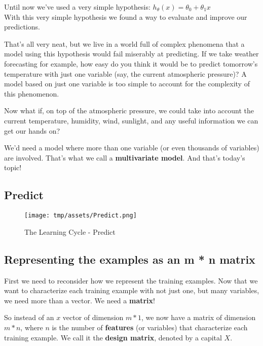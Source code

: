 \documentclass[]{article}
\begin{document}
Until now we've used a very simple hypothesis:
\(h_{\theta}(x) = \theta_0 + \theta_1 x\)\\
With this very simple hypothesis we found a way to evaluate and improve
our predictions.

That's all very neat, but we live in a world full of complex phenomena
that a model using this hypothesis would fail miserably at predicting.
If we take weather forecasting for example, how easy do you think it
would be to predict tomorrow's temperature with just one variable (say,
the current atmospheric pressure)? A model based on just one variable is
too simple to account for the complexity of this phenomenon.

Now what if, on top of the atmospheric pressure, we could take into
account the current temperature, humidity, wind, sunlight, and any
useful information we can get our hands on?

We'd need a model where more than one variable (or even thousands of
variables) are involved. That's what we call a \textbf{multivariate
model}. And that's today's topic!

\hypertarget{predict}{%
\subsection{Predict}\label{predict}}

\begin{figure}
\centering
\texttt{[image: tmp/assets/Predict.png]}
\caption{The Learning Cycle - Predict}
\end{figure}

\hypertarget{representing-the-examples-as-an-m-n-matrix}{%
\subsection{Representing the examples as an m * n
matrix}\label{representing-the-examples-as-an-m-n-matrix}}

First we need to reconsider how we represent the training examples. Now
that we want to characterize each training example with not just one,
but many variables, we need more than a vector. We need a
\textbf{matrix}!

So instead of an \(x\) vector of dimension \(m * 1\), we now have a
matrix of dimension \(m * n\), where \(n\) is the number of
\textbf{features} (or variables) that characterize each training
example. We call it the \textbf{design matrix}, denoted by a capital
\(X\).
\end{document}

